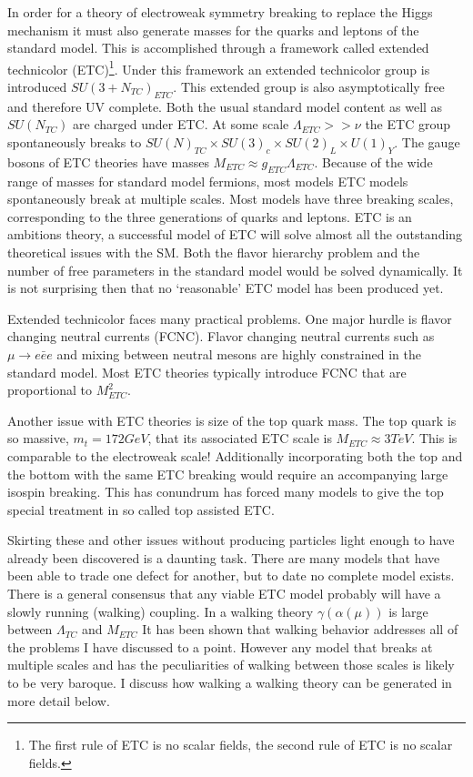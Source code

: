 In order for a theory of electroweak symmetry breaking to replace the Higgs mechanism it must also generate masses for the quarks and leptons of the standard model.
This is accomplished through a framework called extended technicolor (ETC)\footnote{The first rule of ETC is no scalar fields, the second rule of ETC is no scalar fields.}. 
Under this framework an extended technicolor group is introduced $SU(3+N_{TC})_{ETC}$.
This extended group is also asymptotically free and therefore UV complete.
Both the usual standard model content as well as $SU(N_{TC})$ are charged under ETC.
At some scale $\Lambda_{ETC}>>\nu$ the ETC group spontaneously breaks to $SU(N)_{TC}\times SU(3)_c\times SU(2)_L\times U(1)_Y$.
The gauge bosons of ETC theories have masses $M_{ETC} \approx g_{ETC}\Lambda_{ETC}$.
Because of the wide range of masses for standard model fermions, most models ETC models spontaneously break at multiple scales.
Most models have three breaking scales, corresponding to the three generations of quarks and leptons.
ETC is an ambitions theory, a successful model of ETC will solve almost all the outstanding theoretical issues with the SM. 
Both the flavor hierarchy problem and the number of free parameters in the standard model would be solved dynamically.
It is not surprising then that no `reasonable' ETC model has been produced yet.

Extended technicolor faces many practical problems.
One major hurdle is flavor changing neutral currents (FCNC).
Flavor changing neutral currents such as $\mu\rightarrow e\bar{e}e$ and mixing between neutral mesons are highly constrained in the standard model.
Most ETC theories typically introduce FCNC that are proportional to $M^2_{ETC}$.

Another issue with ETC theories is size of the top quark mass.
The top quark is so massive, $m_t=172 GeV$, that its associated ETC scale is $M_{ETC}\approx 3 TeV$.
This is comparable to the electroweak scale!
Additionally incorporating both the top and the bottom with the same ETC breaking would require an accompanying large isospin breaking.
This has conundrum has forced many models to give the top special treatment in so called top assisted ETC.

Skirting these and other issues without producing particles light enough to have already been discovered is a daunting task.
There are many models that have been able to trade one defect for another, but to date no complete model exists.
There is a general consensus that any viable ETC model probably will have a slowly running (walking) coupling.
In a walking theory $\gamma(\alpha(\mu))$ is large between $\Lambda_{TC}$ and $M_{ETC}$ 
It has been shown that walking behavior addresses all of the problems I have discussed to a point.
However any model that breaks at multiple scales and has the peculiarities of walking between those scales is likely to be very baroque.
I discuss how walking a walking theory can be generated in more detail below.

